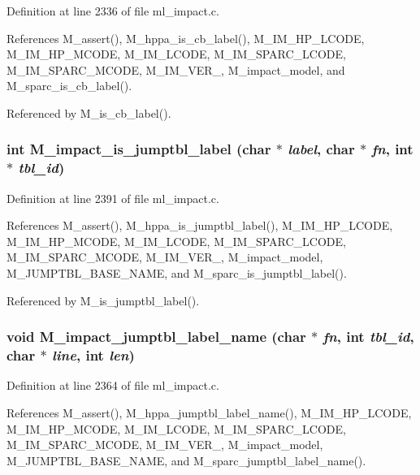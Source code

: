 Definition at line 2336 of file ml\_\-impact.c.

References M\_\-assert(), M\_\-hppa\_\-is\_\-cb\_\-label(), M\_\-IM\_\-HP\_\-LCODE, M\_\-IM\_\-HP\_\-MCODE, M\_\-IM\_\-LCODE, M\_\-IM\_\-SPARC\_\-LCODE, M\_\-IM\_\-SPARC\_\-MCODE, M\_\-IM\_\-VER\_, M\_\-impact\_\-model, and M\_\-sparc\_\-is\_\-cb\_\-label().

Referenced by M\_\-is\_\-cb\_\-label().
\subsubsection{\setlength{\rightskip}{0pt plus 5cm}int M\_\-impact\_\-is\_\-jumptbl\_\-label (char $\ast$ {\em label}, char $\ast$ {\em fn}, int $\ast$ {\em tbl\_\-id})}\label{ml__impact_8c_d8c149aca592f99d47dfe571f7ac6900}




Definition at line 2391 of file ml\_\-impact.c.

References M\_\-assert(), M\_\-hppa\_\-is\_\-jumptbl\_\-label(), M\_\-IM\_\-HP\_\-LCODE, M\_\-IM\_\-HP\_\-MCODE, M\_\-IM\_\-LCODE, M\_\-IM\_\-SPARC\_\-LCODE, M\_\-IM\_\-SPARC\_\-MCODE, M\_\-IM\_\-VER\_, M\_\-impact\_\-model, M\_\-JUMPTBL\_\-BASE\_\-NAME, and M\_\-sparc\_\-is\_\-jumptbl\_\-label().

Referenced by M\_\-is\_\-jumptbl\_\-label().
\subsubsection{\setlength{\rightskip}{0pt plus 5cm}void M\_\-impact\_\-jumptbl\_\-label\_\-name (char $\ast$ {\em fn}, int {\em tbl\_\-id}, char $\ast$ {\em line}, int {\em len})}\label{ml__impact_8c_0400fcf639590896e30935ad2c9efc13}




Definition at line 2364 of file ml\_\-impact.c.

References M\_\-assert(), M\_\-hppa\_\-jumptbl\_\-label\_\-name(), M\_\-IM\_\-HP\_\-LCODE, M\_\-IM\_\-HP\_\-MCODE, M\_\-IM\_\-LCODE, M\_\-IM\_\-SPARC\_\-LCODE, M\_\-IM\_\-SPARC\_\-MCODE, M\_\-IM\_\-VER\_, M\_\-impact\_\-model, M\_\-JUMPTBL\_\-BASE\_\-NAME, and M\_\-sparc\_\-jumptbl\_\-label\_\-name().

